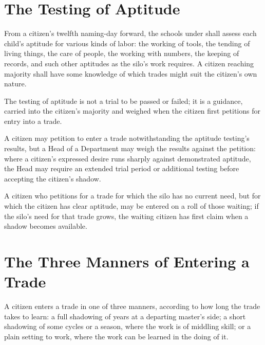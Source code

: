 \section{The Testing of Aptitude}
\label{sec:labor:testing-of-aptitude}

From a citizen's twelfth naming-day forward, the schools under  shall assess each child's aptitude for various kinds of labor: the working of tools, the tending of living things, the care of people, the working with numbers, the keeping of records, and such other aptitudes as the silo's work requires. A citizen reaching majority shall have some knowledge of which trades might suit the citizen's own nature.

\begin{clauses}
\item The testing of aptitude is not a trial to be passed or failed; it is a guidance, carried into the citizen's majority and weighed when the citizen first petitions for entry into a trade.
\item A citizen may petition to enter a trade notwithstanding the aptitude testing's results, but a Head of a Department may weigh the results against the petition: where a citizen's expressed desire runs sharply against demonstrated aptitude, the Head may require an extended trial period or additional testing before accepting the citizen's shadow.
\item A citizen who petitions for a trade for which the silo has no current need, but for which the citizen has clear aptitude, may be entered on a roll of those waiting; if the silo's need for that trade grows, the waiting citizen has first claim when a shadow becomes available.
\end{clauses}

\section{The Three Manners of Entering a Trade}
\label{sec:labor:three-manners-of-entering-a-trade}

A citizen enters a trade in one of three manners, according to how long the trade takes to learn: a full shadowing of years at a departing master's side; a short shadowing of some cycles or a season, where the work is of middling skill; or a plain setting to work, where the work can be learned in the doing of it.


